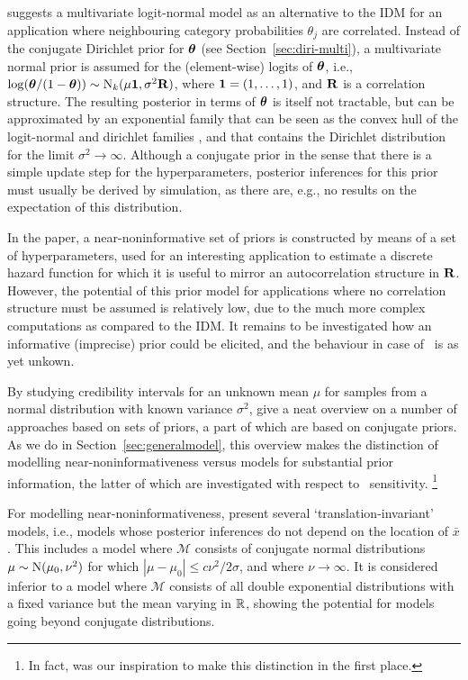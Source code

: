 \textcite{2009:bickis} suggests a multivariate logit-normal model as an alternative to the IDM
for an application where neighbouring category probabilities $\theta_j$ are correlated.
Instead of the conjugate Dirichlet prior for $\boldsymbol{\theta}$ (see Section~\ref{sec:diri-multi}),
a multivariate normal prior is assumed for the (element-wise) logits of $\boldsymbol{\theta}$,
i.e., $\log(\boldsymbol{\theta}/(1-\boldsymbol{\theta})) \sim \operatorname{N}_k(\mu \mathbf{1}, \sigma^2\mathbf{R})$,
where $\mathbf{1} = (1, \ldots, 1)$, and $\mathbf{R}$ is a correlation structure.
The resulting posterior in terms of $\boldsymbol{\theta}$ is itself not tractable, but can be approximated
by an exponential family that can be seen as the convex hull of the logit-normal
and dirichlet families \parencite[p.~189]{2009:bickis},
and that contains the Dirichlet distribution for the limit $\sigma^2 \to \infty$.
Although a conjugate prior in the sense that there is a simple update step for the hyperparameters,
posterior inferences for this prior must usually be derived by simulation,
as there are, e.g., no results on the expectation of this distribution.

In the paper, a near-noninformative set of priors is constructed
by means of a set of hyperparameters,
used for an interesting application to estimate a discrete hazard function
for which it is useful to mirror an autocorrelation structure in $\mathbf{R}$.
However, the potential of this prior model for applications where no correlation structure must be assumed is
relatively low, due to the much more complex computations as compared to the IDM.
It remains to be investigated how an informative (imprecise) prior could be elicited,
and the behaviour in case of \pdc\ is as yet unkown.

\medskip

By studying credibility intervals for an unknown mean $\mu$ for samples from a normal distribution with known variance $\sigma^2$,
\textcite{1991:pericchi} give a neat overview on a number of approaches based on sets of priors,
a part of which are based on conjugate priors.
As we do in Section~\ref{sec:generalmodel},
this overview makes the distinction of modelling near-noninformativeness
versus models for substantial prior information,
the latter of which are investigated with respect to \pdc\ sensitivity.%
\footnote{In fact, \textcite{1991:pericchi} was our inspiration to make this distinction in the first place.}

For modelling near-noninformativeness, \textcite[\S 3]{1991:pericchi}
present several `translation-invariant' models,
i.e., models whose posterior inferences do not depend on the location of $\bar{x}$.
This includes a model where $\mathcal{M}$ consists of conjugate normal distributions $\mu \sim \operatorname{N}(\mu_0, \nu^2)$
for which $|\mu - \mu_0| \le c \nu^2 / 2\sigma$, and where $\nu \to \infty$.
It is considered inferior to a model where $\mathcal{M}$ consists of all double exponential distributions
with a fixed variance but the mean varying in $\mathbb{R}$, %
showing the potential for models going beyond conjugate distributions.

